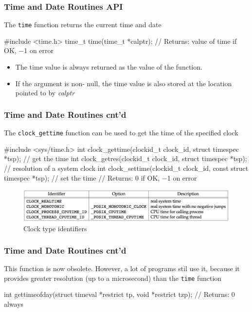 \documentclass[newPxFont,sthlmFooter,nooffset]{beamer}
\begin{document}
\begin{frame}[containsverbatim,t]
  \frametitle{Time and Date Routines API}
The \texttt{time} function returns the current time and date
\begin{codedef}
#include <time.h>
time_t time(time_t *calptr);
// Returns: value of time if OK, −1 on error
\end{codedef}
\begin{itemize}
\item The time value is always returned as the value of the
  function.
\item If the argument is non- null, the time value is also
  stored at the location pointed to by \textit{calptr}
\end{itemize}
\end{frame}


\begin{frame}[containsverbatim,t]
  \frametitle{Time and Date Routines cnt'd}

The \texttt{clock\_gettime} function can be used to get the time of the specified clock

\begin{codedef}
#include <sys/time.h>
int clock_gettime(clockid_t clock_id, struct timespec *tsp); // get the time
int clock_getres(clockid_t clock_id, struct timespec *tsp); // resolution of a system clock
int clock_settime(clockid_t clock_id, const struct timespec *tsp); // set the time
// Returns: 0 if OK, −1 on error  
\end{codedef}

\begin{figure}[h]
  \centering
  \includegraphics[width=\textwidth]{figure/fig6-8_clock.png}
  \caption{Clock type identifiers}
\end{figure}
  
\end{frame}

\begin{frame}[containsverbatim,t]
  \frametitle{Time and Date Routines cnt'd}
This function is now obsolete. However, a lot of programs stil use it, because it provides greater resolution (up to a microsecond) than the \texttt{time} function
\begin{codedef}
int gettimeofday(struct timeval *restrict tp, void *restrict tzp);
// Returns: 0 always
\end{codedef}


\end{frame}
\end{document}
